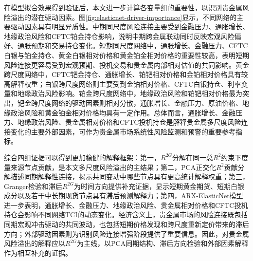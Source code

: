 \documentclass[UTF8,zihao=-4,fontset=fandol]{ctexart}
\begin{document}
在模型拟合效果得到验证后，本文进一步计算各变量组的重要性，以识别贵金属风险溢出的潜在驱动因素。图\ref{fig:elasticnet-driver-importance}显示，不同网络的主要驱动因素具有明显异质性。中期同尺度风险连接主要受到金融压力、通胀增长、地缘政治风险和CFTC铂金持仓影响，说明中期跨金属联动同时反映宏观风险偏好、通胀预期和交易持仓变化。短期同尺度网络中，通胀增长、金融压力、CFTC白银与铂金持仓、黄金白银相对价格和黄金铂金相对价格的重要性较高，表明短期风险连接更容易受到宏观预期、投机交易和贵金属内部相对估值的共同影响。黄金跨尺度网络中，CFTC钯金持仓、通胀增长、铂钯相对价格和金铂相对价格具有较高解释权重；白银跨尺度网络则主要受到金铂相对价格、CFTC白银持仓、利率变量和地缘政治风险影响。铂金跨尺度网络中，地缘政治风险和铂钯相对价格最为突出，钯金跨尺度网络的驱动因素则相对分散，通胀增长、金融压力、原油价格、地缘政治风险和黄金铂金相对价格均具有一定作用。总体而言，通胀增长、金融压力、地缘政治风险、贵金属相对价格和CFTC投机持仓是解释贵金属多尺度风险连接变化的主要外部因素，可作为贵金属市场系统性风险监测和预警的重要参考指标。

综合四组证据可以得到更加稳健的解释框架：第一，$R^{2G}$分解在同一总$R^{2}$约束下度量来源节点贡献，是本文多尺度风险溢出的主结果；第二，PCA正交化$R^{2}$贡献分解描述同期解释性连接，揭示共同变动中哪些节点具有更高统计解释权重；第三，Granger检验和滞后$R^{2G}$为时间方向提供补充证据，显示短期黄金期货、短期白银成分以及若干中长期现货节点具有滞后预测解释力；第四，ARX-ElasticNet模型进一步表明，通胀增长、金融压力、地缘政治风险、贵金属相对价格和CFTC投机持仓会影响不同网络TCI的动态变化。经济含义上，贵金属市场的风险连接既包括同期宏观冲击驱动的共同波动，也包括短期价格发现和跨尺度重新定价带来的滞后方向；外部驱动因素则为识别风险连接增强阶段提供了重要信息。因此，对贵金属风险溢出的解释应以$R^{2G}$为主线，以PCA同期结构、滞后方向检验和外部因素解释作为相互补充的证据。
\end{document}
